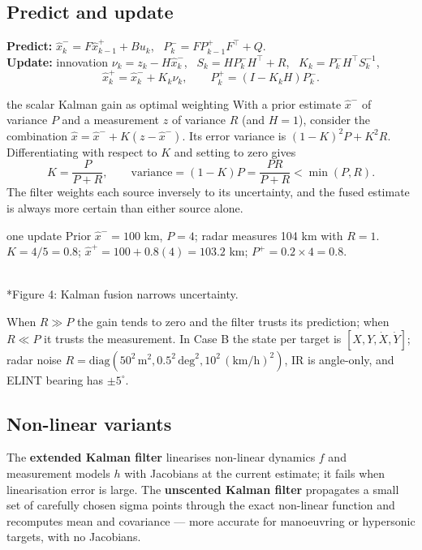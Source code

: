 \documentclass[11pt]{article}
\begin{document}
\subsection{Predict and update}
\textbf{Predict:} $\hat x_k^-=F\hat x_{k-1}^++Bu_k$, \ $P_k^-=FP_{k-1}^+F^\top+Q$.\\
\textbf{Update:} innovation $\nu_k=z_k-H\hat x_k^-$, \ $S_k=HP_k^-H^\top+R$, \ $K_k=P_k^-H^\top S_k^{-1}$,
\[\hat x_k^+=\hat x_k^-+K_k\nu_k,\qquad P_k^+=(I-K_kH)P_k^-.\]
\begin{derivation}{the scalar Kalman gain as optimal weighting}
With a prior estimate $\hat x^-$ of variance $P$ and a measurement $z$ of variance $R$ (and $H=1$), consider the combination $\hat x=\hat x^-+K(z-\hat x^-)$. Its error variance is $(1-K)^2P+K^2R$. Differentiating with respect to $K$ and setting to zero gives
\[K=\frac{P}{P+R},\qquad\text{variance}=(1-K)P=\frac{PR}{P+R}<\min(P,R).\]
The filter weights each source inversely to its uncertainty, and the fused estimate is always more certain than either source alone.
\end{derivation}
\begin{example}{one update}
Prior $\hat x^-=100$ km, $P=4$; radar measures 104 km with $R=1$. $K=4/5=0.8$; $\hat x^+=100+0.8(4)=103.2$ km; $P^+=0.2\times4=0.8$.
\end{example}
\begin{center}\\*{\small\color{GreyN}Figure 4: Kalman fusion narrows uncertainty.}\end{center}
When $R\gg P$ the gain tends to zero and the filter trusts its prediction; when $R\ll P$ it trusts the measurement. In Case B the state per target is $[X,Y,\dot X,\dot Y]$; radar noise $R=\text{diag}(50^2\,\text{m}^2,0.5^2\,\text{deg}^2,10^2\,(\text{km/h})^2)$, IR is angle-only, and ELINT bearing has $\pm5^\circ$.

\subsection{Non-linear variants}
The \textbf{extended Kalman filter} linearises non-linear dynamics $f$ and measurement models $h$ with Jacobians at the current estimate; it fails when linearisation error is large. The \textbf{unscented Kalman filter} propagates a small set of carefully chosen sigma points through the exact non-linear function and recomputes mean and covariance --- more accurate for manoeuvring or hypersonic targets, with no Jacobians.
\end{document}

